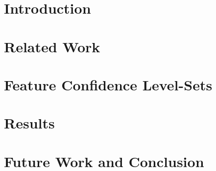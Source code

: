 \section{Introduction}
\label{sec:introduction}


\section{Related Work}
\label{sec:related}


\section{Feature Confidence Level-Sets}
\label{sec:technique}


\section{Results}
\label{sec:results}


\section{Future Work and Conclusion}
\label{sec:conclusion}

